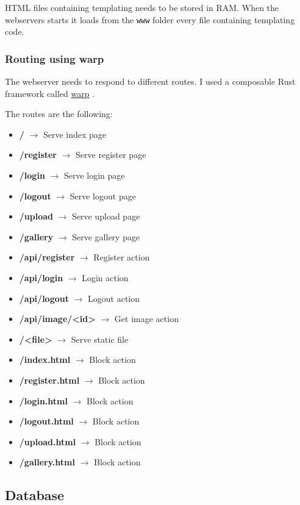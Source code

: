 \documentclass[../documentation.tex]{subfiles}
\begin{document}
HTML files containing templating needs to be stored in RAM.
When the webservers starts it loads from the \texttt{www} folder
every file containing templating code.

\subsubsection{Routing using warp}

The webserver needs to respond to different routes.
I used a composable Rust framework called
\href{https://github.com/seanmonstar/warp}{warp} \cite{warp}.

The routes are the following:
\begin{itemize}
    \item \textbf{/} \(\rightarrow\) Serve index page
    \item \textbf{/register} \(\rightarrow\) Serve register page
    \item \textbf{/login} \(\rightarrow\) Serve login page
    \item \textbf{/logout} \(\rightarrow\) Serve logout page
    \item \textbf{/upload} \(\rightarrow\) Serve upload page
    \item \textbf{/gallery} \(\rightarrow\) Serve gallery page
    \item \textbf{/api/register} \(\rightarrow\) Register action
    \item \textbf{/api/login} \(\rightarrow\) Login action
    \item \textbf{/api/logout} \(\rightarrow\) Logout action
    \item \textbf{/api/image/<id>} \(\rightarrow\) Get image action
    \item \textbf{/<file>} \(\rightarrow\) Serve static file
    \item \textbf{/index.html} \(\rightarrow\) Block action
    \item \textbf{/register.html} \(\rightarrow\) Block action
    \item \textbf{/login.html} \(\rightarrow\) Block action
    \item \textbf{/logout.html} \(\rightarrow\) Block action
    \item \textbf{/upload.html} \(\rightarrow\) Block action
    \item \textbf{/gallery.html} \(\rightarrow\) Block action
\end{itemize}

\pagebreak

\subsection{Database}
\end{document}
